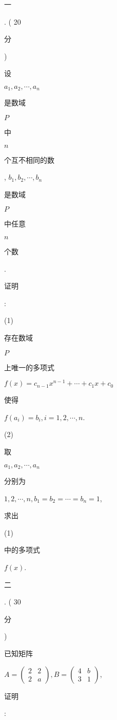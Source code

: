 \documentclass[10pt]{article}
\begin{document}
\begin{CJK}{UTF8}{mj}一\end{CJK}. ( 20 \begin{CJK}{UTF8}{mj}分\end{CJK}) \begin{CJK}{UTF8}{mj}设\end{CJK} $a_{1}, a_{2}, \cdots, a_{n}$ \begin{CJK}{UTF8}{mj}是数域\end{CJK} $P$ \begin{CJK}{UTF8}{mj}中\end{CJK} $n$ \begin{CJK}{UTF8}{mj}个互不相同的数\end{CJK}, $b_{1}, b_{2}, \cdots, b_{n}$ \begin{CJK}{UTF8}{mj}是数域\end{CJK} $P$ \begin{CJK}{UTF8}{mj}中任意\end{CJK} $n$ \begin{CJK}{UTF8}{mj}个数\end{CJK}. \begin{CJK}{UTF8}{mj}证明\end{CJK}:

(1) \begin{CJK}{UTF8}{mj}存在数域\end{CJK} $P$ \begin{CJK}{UTF8}{mj}上唯一的多项式\end{CJK} $f(x)=c_{n-1} x^{n-1}+\cdots+c_{1} x+c_{0}$ \begin{CJK}{UTF8}{mj}使得\end{CJK} $f\left(a_{i}\right)=b_{i}, i=1,2, \cdots, n$.

(2) \begin{CJK}{UTF8}{mj}取\end{CJK} $a_{1}, a_{2}, \cdots, a_{n}$ \begin{CJK}{UTF8}{mj}分别为\end{CJK} $1,2, \cdots, n, b_{1}=b_{2}=\cdots=b_{n}=1$, \begin{CJK}{UTF8}{mj}求出\end{CJK} (1) \begin{CJK}{UTF8}{mj}中的多项式\end{CJK} $f(x)$.

\begin{CJK}{UTF8}{mj}二\end{CJK}. ( 30 \begin{CJK}{UTF8}{mj}分\end{CJK}) \begin{CJK}{UTF8}{mj}已知矩阵\end{CJK} $A=\left(\begin{array}{ll}2 & 2 \\ 2 & a\end{array}\right), B=\left(\begin{array}{cc}4 & b \\ 3 & 1\end{array}\right)$, \begin{CJK}{UTF8}{mj}证明\end{CJK}:
\end{document}
